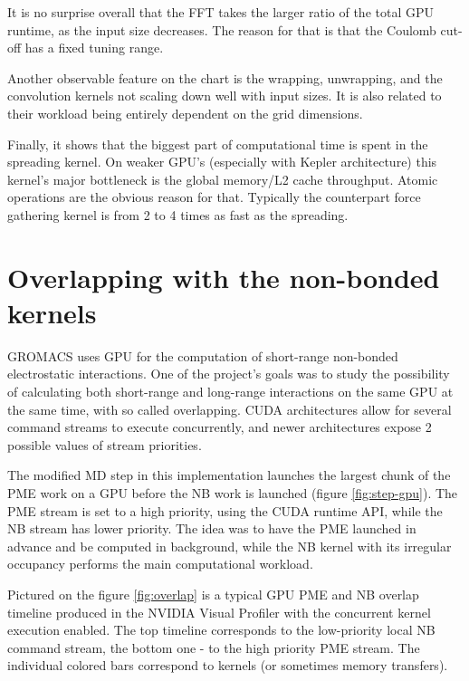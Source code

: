 \documentclass[12pt,a4paper]{report}
\newcommand{\draft}[1]{#1}
\begin{document}

It is no surprise overall that the FFT takes the larger ratio of the total GPU runtime, as the input size decreases. The reason for that is that the Coulomb cut-off has a fixed tuning range.

Another observable feature on the chart is the wrapping, unwrapping, and the convolution kernels not scaling down well with input sizes. It is also related to their workload being entirely dependent on the grid dimensions.

Finally, it shows that the biggest part of computational time is spent in the spreading kernel. On weaker GPU's (especially with Kepler architecture) this kernel's major bottleneck is the global memory/L2 cache throughput. Atomic operations are the obvious reason for that. Typically the counterpart force gathering kernel  is from 2 to 4 times as fast as the spreading. 




\FloatBarrier
\section{Overlapping with the non-bonded kernels}\label{overlapped}

GROMACS uses GPU for the computation of short-range non-bonded electrostatic interactions. One of the project's goals was to study the possibility of calculating both short-range and long-range interactions on the same GPU at the same time, with so called overlapping. CUDA architectures allow for several command streams to execute concurrently, and newer architectures expose 2 possible values of stream priorities.

The modified MD step in this implementation launches the largest chunk of the PME work on a GPU before the NB work is launched (figure \ref{fig:step-gpu}). The PME stream is set to a high priority, using the CUDA runtime API, while the NB stream has lower priority. 
The idea was to have the PME launched in advance and be computed in background, while the NB kernel with its irregular occupancy performs the main computational workload.

Pictured on the figure \ref{fig:overlap} is a typical GPU PME and NB overlap timeline produced in the NVIDIA Visual Profiler with the concurrent kernel execution enabled.
The top timeline corresponds to the low-priority local NB command stream, the bottom one - to the high priority PME stream. The individual colored bars correspond to kernels (or sometimes memory transfers). 
\end{document}
